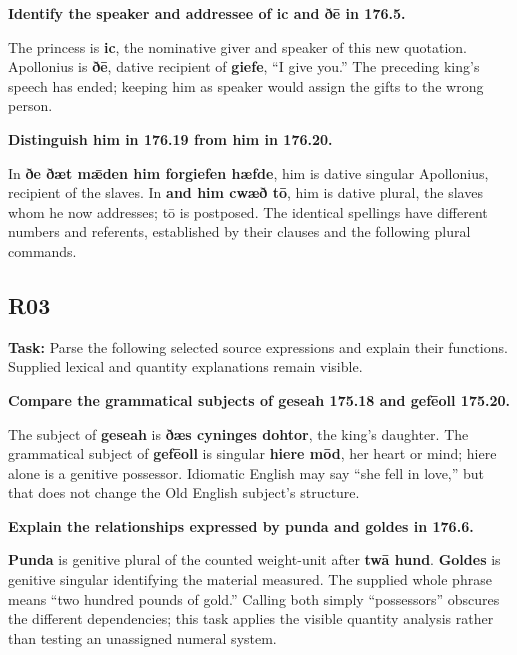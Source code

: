 \textbf{Identify the speaker and addressee of ic and ðē in 176.5.}

The princess is \textbf{ic}, the nominative giver and speaker of this new quotation. Apollonius is \textbf{ðē}, dative recipient of \textbf{giefe}, “I give you.” The preceding king’s speech has ended; keeping him as speaker would assign the gifts to the wrong person.

\textbf{Distinguish him in 176.19 from him in 176.20.}

In \textbf{ðe ðæt mǣden him forgiefen hæfde}, him is dative singular Apollonius, recipient of the slaves. In \textbf{and him cwæð tō}, him is dative plural, the slaves whom he now addresses; tō is postposed. The identical spellings have different numbers and referents, established by their clauses and the following plural commands.

\subsection*{R03}

\textbf{Task:} Parse the following selected source expressions and explain their functions. Supplied lexical and quantity explanations remain visible.

\textbf{Compare the grammatical subjects of geseah 175.18 and gefēoll 175.20.}

The subject of \textbf{geseah} is \textbf{ðæs cyninges dohtor}, the king’s daughter. The grammatical subject of \textbf{gefēoll} is singular \textbf{hiere mōd}, her heart or mind; hiere alone is a genitive possessor. Idiomatic English may say “she fell in love,” but that does not change the Old English subject’s structure.

\textbf{Explain the relationships expressed by punda and goldes in 176.6.}

\textbf{Punda} is genitive plural of the counted weight-unit after \textbf{twā hund}. \textbf{Goldes} is genitive singular identifying the material measured. The supplied whole phrase means “two hundred pounds of gold.” Calling both simply “possessors” obscures the different dependencies; this task applies the visible quantity analysis rather than testing an unassigned numeral system.

